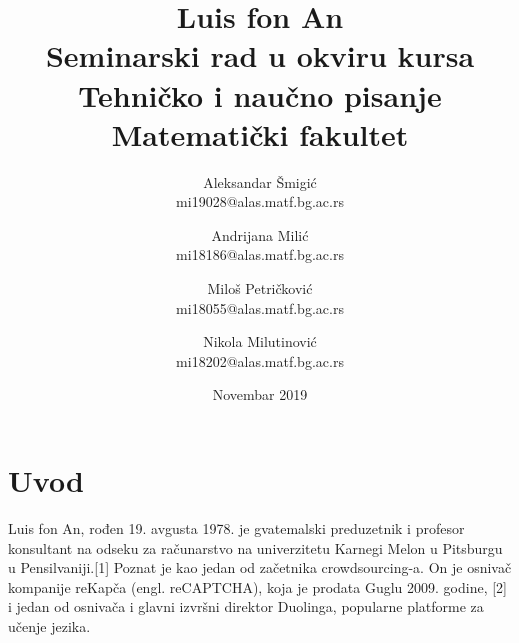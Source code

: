 \documentclass[titlepage, 12pt]{article}
\title{Luis fon An\\ \small{Seminarski rad u okviru kursa\\Tehničko i naučno pisanje\\ Matematički fakultet}}
\author{Aleksandar Šmigić \\ mi19028@alas.matf.bg.ac.rs \and Andrijana Milić \\ mi18186@alas.matf.bg.ac.rs \and Miloš Petričković \\ mi18055@alas.matf.bg.ac.rs \and Nikola Milutinović \\ mi18202@alas.matf.bg.ac.rs}
\date{Novembar 2019}
\begin{document}
\maketitle

\tableofcontents
\newpage
\section{Uvod}
Luis fon An, rođen 19. avgusta 1978. je gvatemalski preduzetnik i profesor konsultant na odseku za računarstvo na univerzitetu Karnegi Melon u Pitsburgu u Pensilvaniji.[1] Poznat je kao jedan od začetnika crowdsourcing-a. On je osnivač kompanije reKapča (engl. reCAPTCHA), koja je prodata Guglu 2009. godine, [2] i jedan od osnivača i glavni izvršni direktor Duolinga, popularne platforme za učenje jezika. 
\end{document}
